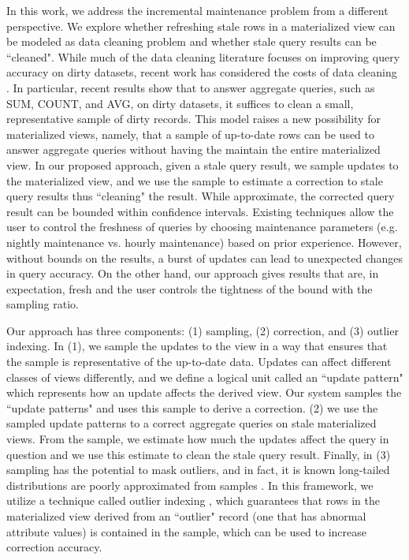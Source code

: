In this work, we address the incremental maintenance problem from a different perspective.
We explore whether refreshing stale rows in a materialized view can be modeled as data cleaning problem and whether stale query results can be ``cleaned".
While much of the data cleaning literature focuses on improving query accuracy on dirty datasets,
recent work has considered the costs of data cleaning \cite{wang1999sample}.
In particular, recent results show that to answer aggregate queries, such as SUM, COUNT, and AVG, on dirty datasets, it suffices to clean a small, representative sample of dirty records.
This model raises a new possibility for materialized views, namely, that a sample of up-to-date rows can be used to answer aggregate queries without having the maintain the entire materialized view.
In our proposed approach, given a stale query result, we sample updates to the materialized view, and we use the sample to estimate a correction to stale query results thus ``cleaning" the result.
While approximate, the corrected query result can be bounded within confidence intervals.
Existing techniques allow the user to control the freshness of queries by choosing maintenance parameters (e.g. nightly maintenance vs. hourly maintenance) based on prior experience. However, without bounds on the results, a burst of updates can lead to unexpected changes in query accuracy.
On the other hand, our approach gives results that are, in expectation, fresh and the user controls the tightness of the bound with the sampling ratio.

Our approach has three components: (1) sampling, (2) correction, and (3) outlier indexing. In (1), we sample the updates to the view in a way that ensures that the sample is representative of the up-to-date data. Updates can affect different classes of views differently, and we define a logical unit called an ``update pattern" which represents how an update affects the derived view. Our system samples the ``update patterns" and uses this sample to derive a correction. (2) we use the sampled update patterns to a correct aggregate queries on stale materialized views.
From the sample, we estimate how much the updates affect the query in question and we use this estimate to clean the stale query result.
Finally, in (3) sampling has the potential to mask outliers, and in fact, it is known
long-tailed distributions are poorly approximated from samples \cite{chaudhuri2001overcoming}.
In this framework, we utilize a technique called outlier indexing \cite{chaudhuri2001overcoming}, which guarantees that rows in the materialized view derived from an ``outlier" record (one that has abnormal attribute values) is contained in the sample, which can be used to increase correction accuracy.

